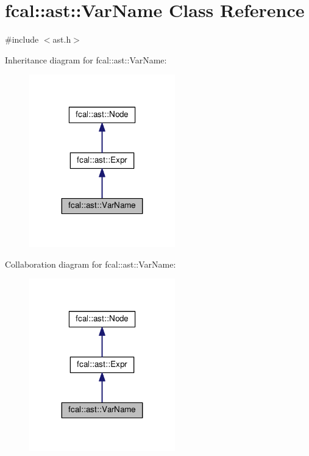 \hypertarget{classfcal_1_1ast_1_1VarName}{}\section{fcal\+:\+:ast\+:\+:Var\+Name Class Reference}
\label{classfcal_1_1ast_1_1VarName}


{\ttfamily \#include $<$ast.\+h$>$}



Inheritance diagram for fcal\+:\+:ast\+:\+:Var\+Name\+:\nopagebreak
\begin{figure}[H]
\begin{center}
\leavevmode
\includegraphics[width=179pt]{classfcal_1_1ast_1_1VarName__inherit__graph}
\end{center}
\end{figure}


Collaboration diagram for fcal\+:\+:ast\+:\+:Var\+Name\+:\nopagebreak
\begin{figure}[H]
\begin{center}
\leavevmode
\includegraphics[width=179pt]{classfcal_1_1ast_1_1VarName__coll__graph}
\end{center}
\end{figure}
